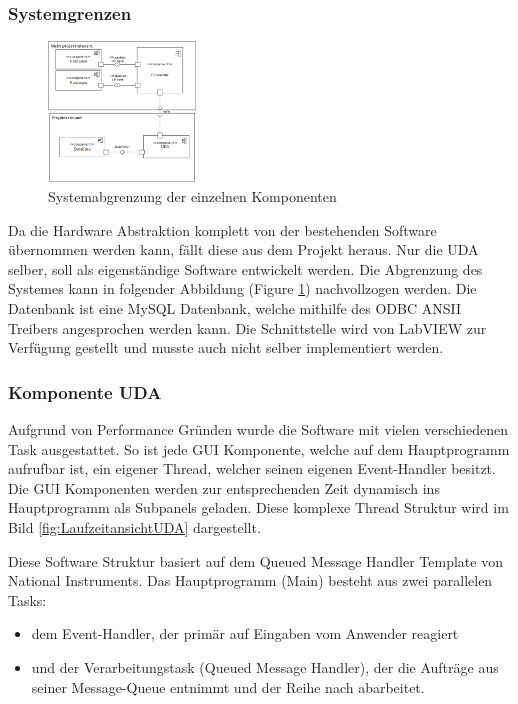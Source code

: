 \documentclass[10pt]{scrartcl}
\begin{document}
\subsubsection{Systemgrenzen}
\begin{figure}
	\begin{center}
		\includegraphics[width=0.35\textwidth]{Systemgrenzen}
		\caption{Systemabgrenzung der einzelnen Komponenten}
		\label{fig:SystemView}			
	\end{center}
\end{figure}
Da die Hardware Abstraktion komplett von der bestehenden Software übernommen werden kann, fällt diese aus dem Projekt heraus. Nur die UDA selber, soll als eigenständige Software entwickelt werden. Die Abgrenzung des Systemes kann in folgender Abbildung (Figure \ref{fig:SystemView}) nachvollzogen werden.
 Die Datenbank ist eine MySQL Datenbank, welche mithilfe des ODBC ANSII Treibers angesprochen werden kann. Die Schnittstelle wird von \gls{LabVIEW} zur Verfügung gestellt und musste auch nicht selber implementiert werden.
\subsubsection{Komponente UDA}
Aufgrund von Performance Gründen wurde die Software mit vielen verschiedenen Task ausgestattet. So ist jede GUI Komponente, welche auf dem Hauptprogramm aufrufbar ist, ein eigener Thread,  welcher seinen eigenen Event-Handler besitzt. Die GUI Komponenten werden zur entsprechenden Zeit dynamisch ins Hauptprogramm als Subpanels geladen. Diese komplexe Thread Struktur wird im Bild \ref{fig:LaufzeitansichtUDA} dargestellt.

Diese Software Struktur basiert auf dem Queued Message Handler Template von National Instruments.
Das Hauptprogramm (Main) besteht aus zwei parallelen Tasks:
\begin{itemize}
	\item dem Event-Handler, der primär auf Eingaben vom Anwender reagiert
	\item und der Verarbeitungstask (Queued Message Handler), der die Aufträge aus seiner Message-Queue entnimmt und der Reihe nach abarbeitet.
\end{itemize}
\end{document}
